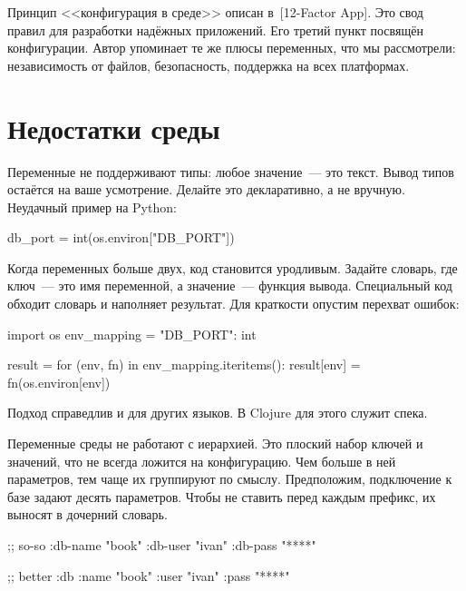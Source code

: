 Принцип <<конфигурация в среде>> описан в~[12-Factor App].
Это свод правил для разработки надёжных приложений. Его третий пункт посвящён конфигурации.
Автор упоминает те же плюсы переменных, что мы рассмотрели: независимость от файлов,
безопасность, поддержка на всех платформах.

\section{Недостатки среды}


Переменные не поддерживают типы: любое значение~--- это текст. Вывод типов остаётся
на ваше усмотрение. Делайте это декларативно, а не вручную. Неудачный пример на
Python:


\begin{english}
  \begin{python}
db_port = int(os.environ["DB_PORT"])
  \end{python}
\end{english}

Когда переменных больше двух, код становится уродливым. Задайте словарь, где
ключ~--- это имя переменной, а значение~--- функция вывода. Специальный код обходит
словарь и наполняет результат. Для краткости опустим перехват ошибок:

\begin{english}
  \begin{python}
import os
env_mapping = {"DB_PORT": int}

result = {}
for (env, fn) in env_mapping.iteritems():
    result[env] = fn(os.environ[env])
  \end{python}
\end{english}

Подход справедлив и для других языков. В Clojure для этого служит спека.

Переменные среды не работают с иерархией. Это плоский набор ключей и значений,
что не всегда ложится на конфигурацию. Чем больше в ней параметров, тем чаще их
группируют по смыслу. Предположим, подключение к базе задают десять
параметров. Чтобы не ставить перед каждым префикс, их выносят в дочерний
словарь.


\ifx\devicetype\mobile

\begin{english}
  \begin{clojure}
;; so-so
{:db-name "book"
 :db-user "ivan"
 :db-pass "****"}
  \end{clojure}

\splitter

  \begin{clojure}
;; better
{:db {:name "book"
      :user "ivan"
      :pass "****"}}
  \end{clojure}
\end{english}

